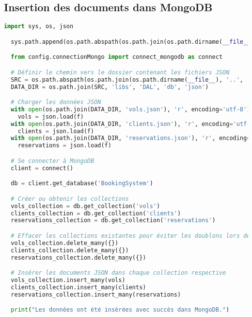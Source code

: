 \subsection{Insertion des documents dans MongoDB}
\label{ann:mongo_insert}
\begin{lstlisting}[language=Python, caption=Script d'insertion des documents dans MongoDB, label=lst:mongo_insert]
  import sys, os, json

  sys.path.append(os.path.abspath(os.path.join(os.path.dirname(__file__), '..', '..')))

  from config.connectionMongo import connect_mongodb as connect

  # Définir le chemin vers le dossier contenant les fichiers JSON
  SRC = os.path.abspath(os.path.join(os.path.dirname(__file__), '..', '..'))
  DATA_DIR = os.path.join(SRC, 'libs', 'DAL', 'db', 'json')

  # Charger les données JSON
  with open(os.path.join(DATA_DIR, 'vols.json'), 'r', encoding='utf-8') as f: 
    vols = json.load(f)
  with open(os.path.join(DATA_DIR, 'clients.json'), 'r', encoding='utf-8') as f: 
    clients = json.load(f)
  with open(os.path.join(DATA_DIR, 'reservations.json'), 'r', encoding='utf-8') as f: 
    reservations = json.load(f)

  # Se connecter à MongoDB
  client = connect()

  db = client.get_database('BookingSystem')

  # Créer ou obtenir les collections
  vols_collection = db.get_collection('vols')
  clients_collection = db.get_collection('clients')
  reservations_collection = db.get_collection('reservations')

  # Effacer les collections existantes pour éviter les doublons lors de ré-exécutions
  vols_collection.delete_many({})
  clients_collection.delete_many({})
  reservations_collection.delete_many({})

  # Insérer les documents JSON dans chaque collection respective
  vols_collection.insert_many(vols)
  clients_collection.insert_many(clients)
  reservations_collection.insert_many(reservations)

  print("Les données ont été insérées avec succès dans MongoDB.")
\end{lstlisting}

